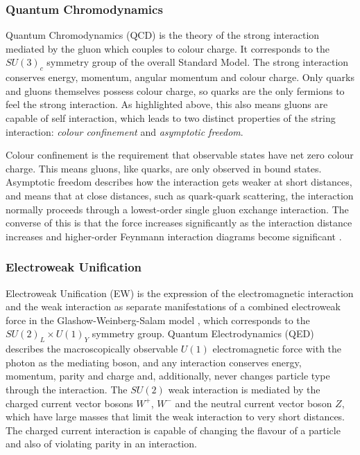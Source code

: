 		\subsubsection{Quantum Chromodynamics}

		Quantum Chromodynamics (QCD) is the theory of the strong interaction mediated by the gluon which couples to colour charge. It corresponds to the $SU(3)_c$ symmetry group of the overall Standard Model. The strong interaction conserves energy, momentum, angular momentum and colour charge. Only quarks and gluons themselves possess colour charge, so quarks are the only fermions to feel the strong interaction. As highlighted above, this also means gluons are capable of self interaction, which leads to two distinct properties of the string interaction: \textit{colour confinement} and \textit{asymptotic freedom}.

		Colour confinement is the requirement that observable states have net zero colour charge. This means gluons, like quarks, are only observed in bound states. Asymptotic freedom describes how the interaction gets weaker at short distances, and means that at close distances, such as quark-quark scattering, the interaction normally proceeds through a lowest-order single gluon exchange interaction. The converse of this is that the force increases significantly as the interaction distance increases and higher-order Feynmann interaction diagrams become significant \cite{martinshaw}.

		\subsubsection{Electroweak Unification}

		Electroweak Unification (EW) is the expression of the electromagnetic interaction and the weak interaction as separate manifestations of a combined electroweak force in the Glashow-Weinberg-Salam model \cite{gws-g, gws-w, gws-s}, which corresponds to the $SU(2)_L\times U(1)_Y$ symmetry group. Quantum Electrodynamics (QED) describes the macroscopically observable $U(1)$ electromagnetic force  with the photon as the mediating boson, and any interaction conserves energy, momentum, parity and charge and, additionally, never changes particle type through the interaction. The $SU(2)$ weak interaction is mediated by the charged current vector bosons $W^+$, $W^-$ and the neutral current vector boson $Z$, which have large masses that limit the weak interaction to very short distances. The charged current interaction is capable of changing the flavour of a particle and also of violating parity in an interaction.

